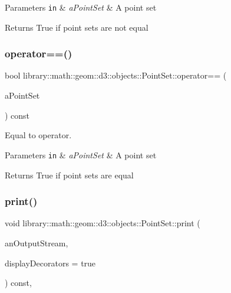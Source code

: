 \begin{DoxyParams}[1]{Parameters}
\mbox{\tt in}  & {\em a\+Point\+Set} & A point set \\
\hline
\end{DoxyParams}
\begin{DoxyReturn}{Returns}
True if point sets are not equal 
\end{DoxyReturn}
\mbox{\label{classlibrary_1_1math_1_1geom_1_1d3_1_1objects_1_1_point_set_afd9dc122c96bb0807bbe5ba6d84be519}} 
\subsubsection{\texorpdfstring{operator==()}{operator==()}}
{\footnotesize\ttfamily bool library\+::math\+::geom\+::d3\+::objects\+::\+Point\+Set\+::operator== (\begin{DoxyParamCaption}\item[{const \hyperlink{classlibrary_1_1math_1_1geom_1_1d3_1_1objects_1_1_point_set}{Point\+Set} \&}]{a\+Point\+Set }\end{DoxyParamCaption}) const}



Equal to operator. 


\begin{DoxyParams}[1]{Parameters}
\mbox{\tt in}  & {\em a\+Point\+Set} & A point set \\
\hline
\end{DoxyParams}
\begin{DoxyReturn}{Returns}
True if point sets are equal 
\end{DoxyReturn}
\mbox{\label{classlibrary_1_1math_1_1geom_1_1d3_1_1objects_1_1_point_set_ab1a24422b85249c21feb603025140c1a}} 
\subsubsection{\texorpdfstring{print()}{print()}}
{\footnotesize\ttfamily void library\+::math\+::geom\+::d3\+::objects\+::\+Point\+Set\+::print (\begin{DoxyParamCaption}\item[{std\+::ostream \&}]{an\+Output\+Stream,  }\item[{bool}]{display\+Decorators = {\ttfamily true} }\end{DoxyParamCaption}) const\hspace{0.3cm}{\ttfamily [override]}, {\ttfamily [virtual]}}




